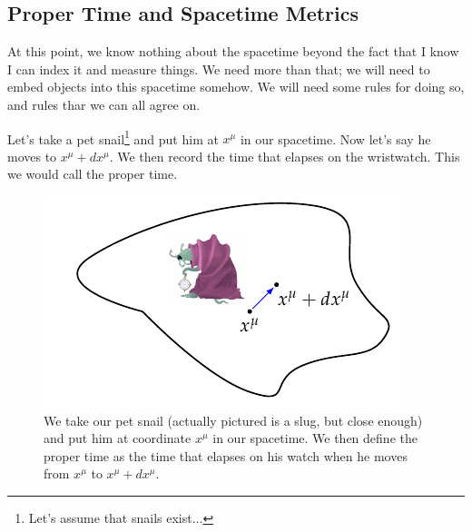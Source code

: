 \subsection{Proper Time and Spacetime Metrics}
At this point, we know nothing about the spacetime beyond the fact that I know I can index it and measure things. We need more than that; we will need to embed objects into this spacetime somehow. We will need some rules for doing so, and rules thar we can all agree on.

Let's take a pet snail\footnote{Let's assume that snails exist...} and put him at $x^\mu$ in our spacetime. Now let's say he moves to $x^\mu + dx^\mu$. We then record the time that elapses on the wristwatch. This we would call the proper time. 

\begin{figure}[htbp]
    \centering
    \includegraphics[]{Images/fig-propertime.pdf}

    \caption{We take our pet snail (actually pictured is a slug, but close enough) and put him at coordinate $x^\mu$ in our spacetime. We then define the proper time as the time that elapses on his watch when he moves from $x^\mu$ to $x^\mu + dx^\mu$.}
    \label{<label>}
\end{figure}

